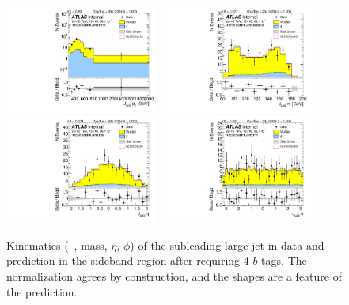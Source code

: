 \begin{figure}[htbp!]
\begin{center}
\includegraphics[width=0.45\textwidth,angle=-90]{figures/boosted/Sideband/b77_FourTag_Sideband_sublHCand_Pt_m_1.pdf}
\includegraphics[width=0.45\textwidth,angle=-90]{figures/boosted/Sideband/b77_FourTag_Sideband_sublHCand_Mass_s.pdf}\\
\includegraphics[width=0.45\textwidth,angle=-90]{figures/boosted/Sideband/b77_FourTag_Sideband_sublHCand_Eta.pdf}
\includegraphics[width=0.45\textwidth,angle=-90]{figures/boosted/Sideband/b77_FourTag_Sideband_sublHCand_Phi.pdf}
  \caption{Kinematics (\pt~, mass, $\eta$, $\phi$) of the subleading large-\R jet in data and prediction in the sideband region after requiring 4 $b$-tags. The normalization agrees by construction, and the shapes are a feature of the prediction.}
  \label{fig:boosted-4b-sideband-ak10-subl}
\end{center}
\end{figure}

